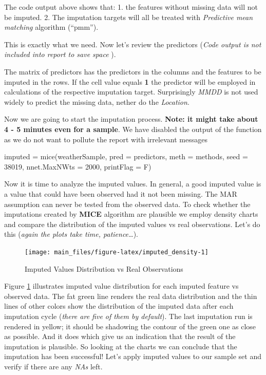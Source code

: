 The code output above shows that: 1. the features without missing data
will not be imputed. 2. The imputation targets will all be treated with
\emph{Predictive mean matching} algorithm (``pmm'').

This is exactly what we need. Now let's review the predictors
(\emph{Code output is not included into report to save space }).

The matrix of predictors has the predictors in the columns and the
features to be imputed in the rows. If the cell value equals \textbf{1}
the predictor will be employed in calculations of the respective
imputation target. Surprisingly \emph{MMDD} is not used widely to
predict the missing data, nether do the \emph{Location}.

Now we are going to start the imputation process. \textbf{Note: it might
take about 4 - 5 minutes even for a sample}. We have disabled the output
of the function as we do not want to pollute the report with irrelevant
messages

\begin{Schunk}
\begin{Sinput}
imputed = mice(weatherSample, pred = predictors, meth = methods, seed = 38019,
               nnet.MaxNWts = 2000, printFlag = F)
\end{Sinput}
\end{Schunk}

Now it is time to analyze the imputed values. In general, a good imputed
value is a value that could have been observed had it not been missing.
The MAR assumption can never be tested from the observed data. To check
whether the imputations created by \textbf{MICE} algorithm are plausible
we employ density charts and compare the distribution of the imputed
values vs real observations. Let's do this (\emph{again the plots take
time, patience\ldots{}}).

\begin{Schunk}
\begin{figure}[H]

{\centering \texttt{[image: main\_files/figure-latex/imputed\_density-1]} 

}

\caption[Imputed Values Distribution vs Real Observations]{Imputed Values Distribution vs Real Observations}\label{fig:imputed_density}
\end{figure}
\end{Schunk}

Figure \ref{fig:imputed_density} illustrates imputed value distribution
for each imputed feature vs observed data. The fat green line renders
the real data distribution and the thin lines of other colors show the
distribution of the imputed data after each imputation cycle
(\emph{there are five of them by default}). The last imputation run is
rendered in yellow; it should be shadowing the contour of the green one
as close as possible. And it does which give us an indication that the
result of the imputation is plausible. So looking at the charts we can
conclude that the imputation has been successful! Let's apply imputed
values to our sample set and verify if there are any \emph{NAs} left.

